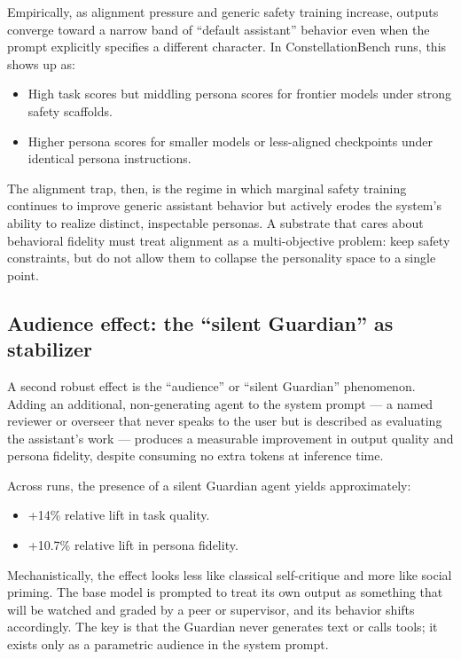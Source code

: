 \documentclass{article}
\providecommand{\tightlist}{\setlength{\itemsep}{0pt}\setlength{\parskip}{0pt}}
\begin{document}
Empirically, as alignment pressure and generic safety training increase,
outputs converge toward a narrow band of ``default assistant'' behavior
even when the prompt explicitly specifies a different character. In
ConstellationBench runs, this shows up as:

\begin{itemize}
\tightlist
\item
  High task scores but middling persona scores for frontier models under
  strong safety scaffolds.
\item
  Higher persona scores for smaller models or less-aligned checkpoints
  under identical persona instructions.
\end{itemize}

The alignment trap, then, is the regime in which marginal safety
training continues to improve generic assistant behavior but actively
erodes the system's ability to realize distinct, inspectable personas. A
substrate that cares about behavioral fidelity must treat alignment as a
multi-objective problem: keep safety constraints, but do not allow them
to collapse the personality space to a single point.

\subsection{Audience effect: the ``silent Guardian'' as
stabilizer}\label{audience-effect-the-silent-guardian-as-stabilizer}

A second robust effect is the ``audience'' or ``silent Guardian''
phenomenon. Adding an additional, non-generating agent to the system
prompt --- a named reviewer or overseer that never speaks to the user
but is described as evaluating the assistant's work --- produces a
measurable improvement in output quality and persona fidelity, despite
consuming no extra tokens at inference time.

Across runs, the presence of a silent Guardian agent yields
approximately:

\begin{itemize}
\tightlist
\item
  +14\% relative lift in task quality.
\item
  +10.7\% relative lift in persona fidelity.
\end{itemize}

Mechanistically, the effect looks less like classical self-critique and
more like social priming. The base model is prompted to treat its own
output as something that will be watched and graded by a peer or
supervisor, and its behavior shifts accordingly. The key is that the
Guardian never generates text or calls tools; it exists only as a
parametric audience in the system prompt.
\end{document}
